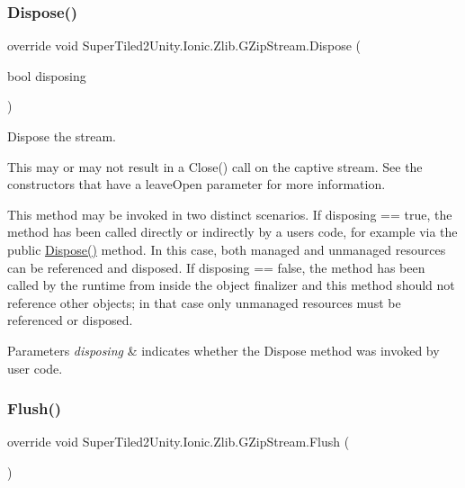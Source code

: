 \subsubsection{\texorpdfstring{Dispose()}{Dispose()}}
{\footnotesize\ttfamily override void Super\+Tiled2\+Unity.\+Ionic.\+Zlib.\+G\+Zip\+Stream.\+Dispose (\begin{DoxyParamCaption}\item[{bool}]{disposing }\end{DoxyParamCaption})\hspace{0.3cm}{\ttfamily [protected]}}



Dispose the stream. 

This may or may not result in a {\ttfamily Close()} call on the captive stream. See the constructors that have a {\ttfamily leave\+Open} parameter for more information. 

This method may be invoked in two distinct scenarios. If disposing == true, the method has been called directly or indirectly by a user\textquotesingle{}s code, for example via the public \mbox{\hyperlink{class_super_tiled2_unity_1_1_ionic_1_1_zlib_1_1_g_zip_stream_a43554a520237d8aedb81068572f93507}{Dispose()}} method. In this case, both managed and unmanaged resources can be referenced and disposed. If disposing == false, the method has been called by the runtime from inside the object finalizer and this method should not reference other objects; in that case only unmanaged resources must be referenced or disposed. 


\begin{DoxyParams}{Parameters}
{\em disposing} & indicates whether the Dispose method was invoked by user code. \\
\hline
\end{DoxyParams}
\mbox{\label{class_super_tiled2_unity_1_1_ionic_1_1_zlib_1_1_g_zip_stream_ad71244e7b3bcea606d73cbf964f9f239}} 
\subsubsection{\texorpdfstring{Flush()}{Flush()}}
{\footnotesize\ttfamily override void Super\+Tiled2\+Unity.\+Ionic.\+Zlib.\+G\+Zip\+Stream.\+Flush (\begin{DoxyParamCaption}{ }\end{DoxyParamCaption})}



